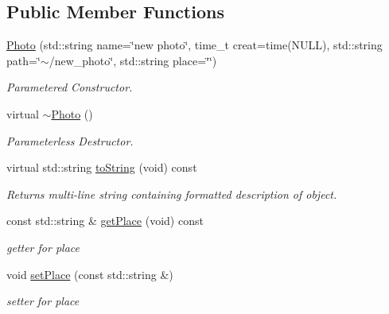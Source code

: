 \subsection*{Public Member Functions}
\begin{DoxyCompactItemize}
\item 
\hypertarget{classPhoto_a77533515f74784f105299a7fe911833a}{\hyperlink{classPhoto_a77533515f74784f105299a7fe911833a}{Photo} (std\-::string name=\char`\"{}new photo\char`\"{}, time\-\_\-t creat=time(N\-U\-L\-L), std\-::string path=\char`\"{}$\sim$/new\-\_\-photo\char`\"{}, std\-::string place=\char`\"{}\char`\"{})}\label{classPhoto_a77533515f74784f105299a7fe911833a}

\begin{DoxyCompactList}\small\item\em Parametered Constructor. \end{DoxyCompactList}\item 
virtual \hyperlink{classPhoto_adc366234be6226600360c7cbba8e7fcf}{$\sim$\-Photo} ()
\begin{DoxyCompactList}\small\item\em Parameterless Destructor. \end{DoxyCompactList}\item 
\hypertarget{classPhoto_a8be4be2bb68b6db13ec45ff3bed71481}{virtual std\-::string \hyperlink{classPhoto_a8be4be2bb68b6db13ec45ff3bed71481}{to\-String} (void) const }\label{classPhoto_a8be4be2bb68b6db13ec45ff3bed71481}

\begin{DoxyCompactList}\small\item\em Returns multi-\/line string containing formatted description of object. \end{DoxyCompactList}\item 
\hypertarget{classPhoto_a1c84436ddbf58a50b632f1ef49c1fe31}{const std\-::string \& \hyperlink{classPhoto_a1c84436ddbf58a50b632f1ef49c1fe31}{get\-Place} (void) const }\label{classPhoto_a1c84436ddbf58a50b632f1ef49c1fe31}

\begin{DoxyCompactList}\small\item\em getter for place \end{DoxyCompactList}\item 
\hypertarget{classPhoto_ae835a7d23db2b2f6b90d1efaaf034959}{void \hyperlink{classPhoto_ae835a7d23db2b2f6b90d1efaaf034959}{set\-Place} (const std\-::string \&)}\label{classPhoto_ae835a7d23db2b2f6b90d1efaaf034959}

\begin{DoxyCompactList}\small\item\em setter for place \end{DoxyCompactList}\end{DoxyCompactItemize}


